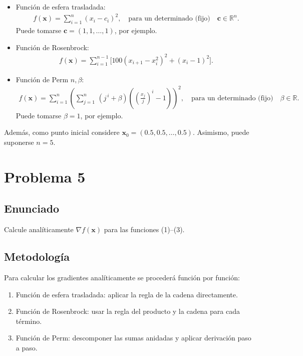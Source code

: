 \documentclass{article}
\begin{document}
\begin{itemize}
    \item Función de esfera trasladada:\\
    \begin{align}
        f(\mathbf{x}) = \sum_{i=1}^{n} (x_i - c_i)^2, \quad \text{para un determinado (fijo)} \quad \mathbf{c} \in \mathbb{R}^n.
    \end{align}
    Puede tomarse $\mathbf{c} = (1,1,\dots,1)$, por ejemplo.

    \item Función de Rosenbrock:\\
    \begin{align}
        f(\mathbf{x}) = \sum_{i=1}^{n-1} \Big[ 100(x_{i+1} - x_i^{2})^{2} + (x_i - 1)^{2} \Big].
    \end{align}

    \item Función de Perm $n,\beta$:\\
    \begin{align}
        f(\mathbf{x}) =
        \sum_{i=1}^{n} \left(
            \sum_{j=1}^{n}\,(j^{\,i} + \beta)\left( \left(\frac{x_j}{j}\right)^{i} - 1 \right)
        \right)^{2}, \quad \text{para un determinado (fijo)} \quad \beta \in \mathbb{R}.
    \end{align}
    Puede tomarse $\beta = 1$, por ejemplo.
\end{itemize}
Además, como punto inicial considere $\mathbf{x}_0 = (0.5,0.5,\dots,0.5)$. Asimismo, puede suponerse $n=5$.

\section{Problema 5}

\subsection{Enunciado}
Calcule analíticamente $\nabla f(\mathbf{x})$ para las funciones (1)--(3).

\subsection{Metodología}

Para calcular los gradientes analíticamente se procederá función por función:
\begin{enumerate}
    \item Función de esfera trasladada: aplicar la regla de la cadena directamente.
    \item Función de Rosenbrock: usar la regla del producto y la cadena para cada término.
    \item Función de Perm: descomponer las sumas anidadas y aplicar derivación paso a paso.
\end{enumerate}
\end{document}
